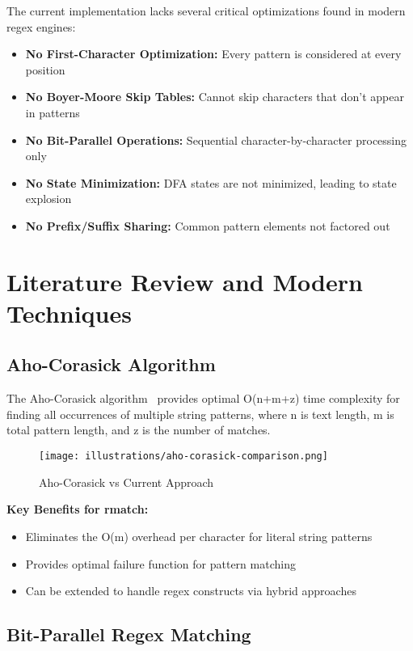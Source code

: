 \documentclass[11pt,a4paper]{article}
\begin{document}
The current implementation lacks several critical optimizations found in modern regex engines:

\begin{itemize}
\item \textbf{No First-Character Optimization:} Every pattern is considered at every position
\item \textbf{No Boyer-Moore Skip Tables:} Cannot skip characters that don't appear in patterns
\item \textbf{No Bit-Parallel Operations:} Sequential character-by-character processing only
\item \textbf{No State Minimization:} DFA states are not minimized, leading to state explosion
\item \textbf{No Prefix/Suffix Sharing:} Common pattern elements not factored out
\end{itemize}

\section{Literature Review and Modern Techniques}

\subsection{Aho-Corasick Algorithm}

The Aho-Corasick algorithm~\cite{aho1975efficient} provides optimal O(n+m+z) time complexity for finding all occurrences of multiple string patterns, where n is text length, m is total pattern length, and z is the number of matches.

\begin{figure}[htbp]
\centering
\texttt{[image: illustrations/aho-corasick-comparison.png]}
\caption{Aho-Corasick vs Current Approach}
\label{fig:aho-corasick}
\end{figure}

\textbf{Key Benefits for rmatch:}
\begin{itemize}
\item Eliminates the O(m) overhead per character for literal string patterns
\item Provides optimal failure function for pattern matching
\item Can be extended to handle regex constructs via hybrid approaches
\end{itemize}

\subsection{Bit-Parallel Regex Matching}
\end{document}

